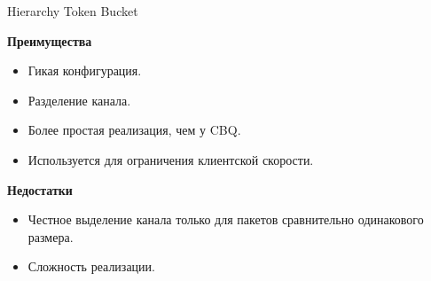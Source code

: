 \documentclass[12pt]{beamer}
\begin{document}
\begin{frame}{Hierarchy Token Bucket}
\begin{center}
    {\footnotesize
            \begin{multicols}{2}
				{\bf Преимущества}
				\begin{itemize}
					\item Гикая конфигурация.
					\item Разделение канала.
					\item Более простая реализация, чем у CBQ.
					\item Используется для ограничения клиентской скорости.
				\end{itemize}
            \columnbreak
				{\bf Недостатки}
				\begin{itemize}
					\item Честное выделение канала только для пакетов сравнительно одинакового размера.
					\item Сложность реализации.
				\end{itemize}
            \end{multicols}
    }
	\end{center}
\end{frame}
\end{document}
